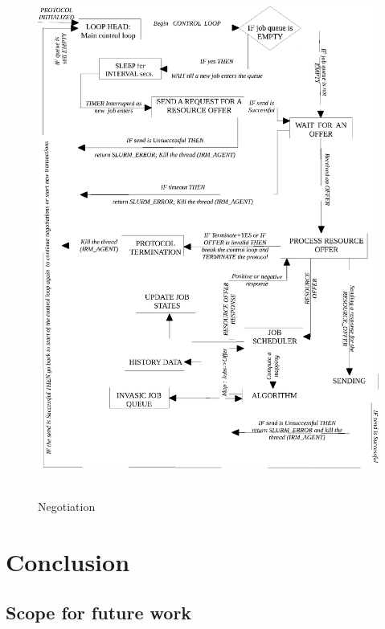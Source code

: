 \documentclass[a4paper, 12pt]{article}
\begin{document}
\clearpage
\begin{figure}[h]
\centering
\includegraphics[width=1.0\textwidth, height=170mm]{./Negotiation.eps}
\caption{Negotiation}
\label{fig:Neg}
\end{figure}
\clearpage
\section{Conclusion}
\subsection{Scope for future work}
\nocite{fontaine,gao,poorzahedy2,tianze,leblanc,kuo,poorzahedy1,wen}



\end{document}
